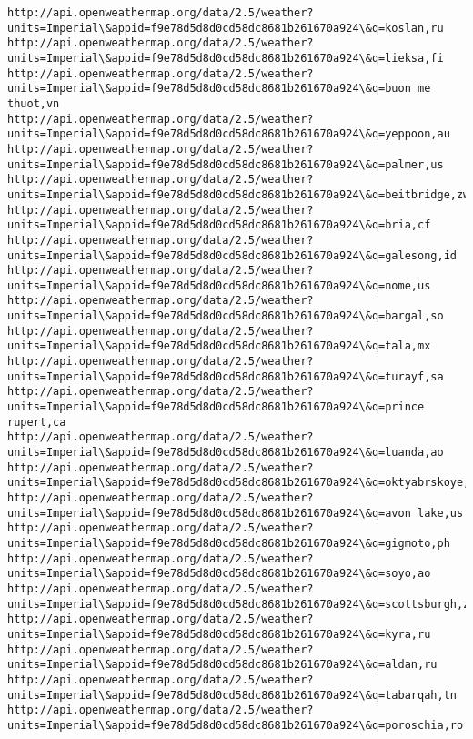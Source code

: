\documentclass[11pt]{article}
\begin{document}
\begin{Verbatim}[commandchars=\\\{\}]
http://api.openweathermap.org/data/2.5/weather?units=Imperial\&appid=f9e78d5d8d0cd58dc8681b261670a924\&q=koslan,ru
http://api.openweathermap.org/data/2.5/weather?units=Imperial\&appid=f9e78d5d8d0cd58dc8681b261670a924\&q=lieksa,fi
http://api.openweathermap.org/data/2.5/weather?units=Imperial\&appid=f9e78d5d8d0cd58dc8681b261670a924\&q=buon me thuot,vn
http://api.openweathermap.org/data/2.5/weather?units=Imperial\&appid=f9e78d5d8d0cd58dc8681b261670a924\&q=yeppoon,au
http://api.openweathermap.org/data/2.5/weather?units=Imperial\&appid=f9e78d5d8d0cd58dc8681b261670a924\&q=palmer,us
http://api.openweathermap.org/data/2.5/weather?units=Imperial\&appid=f9e78d5d8d0cd58dc8681b261670a924\&q=beitbridge,zw
http://api.openweathermap.org/data/2.5/weather?units=Imperial\&appid=f9e78d5d8d0cd58dc8681b261670a924\&q=bria,cf
http://api.openweathermap.org/data/2.5/weather?units=Imperial\&appid=f9e78d5d8d0cd58dc8681b261670a924\&q=galesong,id
http://api.openweathermap.org/data/2.5/weather?units=Imperial\&appid=f9e78d5d8d0cd58dc8681b261670a924\&q=nome,us
http://api.openweathermap.org/data/2.5/weather?units=Imperial\&appid=f9e78d5d8d0cd58dc8681b261670a924\&q=bargal,so
http://api.openweathermap.org/data/2.5/weather?units=Imperial\&appid=f9e78d5d8d0cd58dc8681b261670a924\&q=tala,mx
http://api.openweathermap.org/data/2.5/weather?units=Imperial\&appid=f9e78d5d8d0cd58dc8681b261670a924\&q=turayf,sa
http://api.openweathermap.org/data/2.5/weather?units=Imperial\&appid=f9e78d5d8d0cd58dc8681b261670a924\&q=prince rupert,ca
http://api.openweathermap.org/data/2.5/weather?units=Imperial\&appid=f9e78d5d8d0cd58dc8681b261670a924\&q=luanda,ao
http://api.openweathermap.org/data/2.5/weather?units=Imperial\&appid=f9e78d5d8d0cd58dc8681b261670a924\&q=oktyabrskoye,ru
http://api.openweathermap.org/data/2.5/weather?units=Imperial\&appid=f9e78d5d8d0cd58dc8681b261670a924\&q=avon lake,us
http://api.openweathermap.org/data/2.5/weather?units=Imperial\&appid=f9e78d5d8d0cd58dc8681b261670a924\&q=gigmoto,ph
http://api.openweathermap.org/data/2.5/weather?units=Imperial\&appid=f9e78d5d8d0cd58dc8681b261670a924\&q=soyo,ao
http://api.openweathermap.org/data/2.5/weather?units=Imperial\&appid=f9e78d5d8d0cd58dc8681b261670a924\&q=scottsburgh,za
http://api.openweathermap.org/data/2.5/weather?units=Imperial\&appid=f9e78d5d8d0cd58dc8681b261670a924\&q=kyra,ru
http://api.openweathermap.org/data/2.5/weather?units=Imperial\&appid=f9e78d5d8d0cd58dc8681b261670a924\&q=aldan,ru
http://api.openweathermap.org/data/2.5/weather?units=Imperial\&appid=f9e78d5d8d0cd58dc8681b261670a924\&q=tabarqah,tn
http://api.openweathermap.org/data/2.5/weather?units=Imperial\&appid=f9e78d5d8d0cd58dc8681b261670a924\&q=poroschia,ro

\end{Verbatim}
\end{document}
